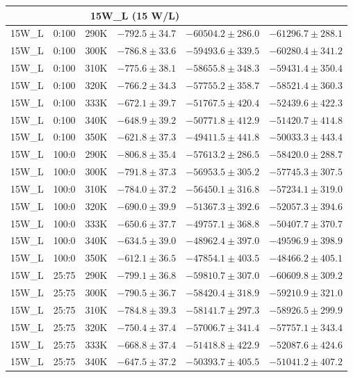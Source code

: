 \begin{longtable}{|c|c|c|c|c|c|}
\midrule \multicolumn{5}{c}{\textbf{15W\_L (15 W/L)}} \\ \midrule
15W\_L & 0:100 & 290K & $-792.5 \pm 34.7$ & $-60504.2 \pm 286.0$ & $-61296.7 \pm 288.1$ \\
15W\_L & 0:100 & 300K & $-786.8 \pm 33.6$ & $-59493.6 \pm 339.5$ & $-60280.4 \pm 341.2$ \\
15W\_L & 0:100 & 310K & $-775.6 \pm 38.1$ & $-58655.8 \pm 348.3$ & $-59431.4 \pm 350.4$ \\
15W\_L & 0:100 & 320K & $-766.2 \pm 34.3$ & $-57755.2 \pm 358.7$ & $-58521.4 \pm 360.3$ \\
15W\_L & 0:100 & 333K & $-672.1 \pm 39.7$ & $-51767.5 \pm 420.4$ & $-52439.6 \pm 422.3$ \\
15W\_L & 0:100 & 340K & $-648.9 \pm 39.2$ & $-50771.8 \pm 412.9$ & $-51420.7 \pm 414.8$ \\
15W\_L & 0:100 & 350K & $-621.8 \pm 37.3$ & $-49411.5 \pm 441.8$ & $-50033.3 \pm 443.4$ \\
15W\_L & 100:0 & 290K & $-806.8 \pm 35.4$ & $-57613.2 \pm 286.5$ & $-58420.0 \pm 288.7$ \\
15W\_L & 100:0 & 300K & $-791.8 \pm 37.3$ & $-56953.5 \pm 305.2$ & $-57745.3 \pm 307.5$ \\
15W\_L & 100:0 & 310K & $-784.0 \pm 37.2$ & $-56450.1 \pm 316.8$ & $-57234.1 \pm 319.0$ \\
15W\_L & 100:0 & 320K & $-690.0 \pm 39.9$ & $-51367.3 \pm 392.6$ & $-52057.3 \pm 394.6$ \\
15W\_L & 100:0 & 333K & $-650.6 \pm 37.7$ & $-49757.1 \pm 368.8$ & $-50407.7 \pm 370.7$ \\
15W\_L & 100:0 & 340K & $-634.5 \pm 39.0$ & $-48962.4 \pm 397.0$ & $-49596.9 \pm 398.9$ \\
15W\_L & 100:0 & 350K & $-612.1 \pm 36.5$ & $-47854.1 \pm 403.5$ & $-48466.2 \pm 405.1$ \\
15W\_L & 25:75 & 290K & $-799.1 \pm 36.8$ & $-59810.7 \pm 307.0$ & $-60609.8 \pm 309.2$ \\
15W\_L & 25:75 & 300K & $-790.5 \pm 36.7$ & $-58420.4 \pm 318.9$ & $-59210.9 \pm 321.0$ \\
15W\_L & 25:75 & 310K & $-784.8 \pm 39.3$ & $-58141.7 \pm 297.3$ & $-58926.5 \pm 299.9$ \\
15W\_L & 25:75 & 320K & $-750.4 \pm 37.4$ & $-57006.7 \pm 341.4$ & $-57757.1 \pm 343.4$ \\
15W\_L & 25:75 & 333K & $-668.8 \pm 37.4$ & $-51418.8 \pm 422.9$ & $-52087.6 \pm 424.6$ \\
15W\_L & 25:75 & 340K & $-647.5 \pm 37.2$ & $-50393.7 \pm 405.5$ & $-51041.2 \pm 407.2$ \\

\end{longtable}
